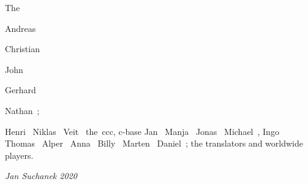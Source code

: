 \smallskip

\noindent The 

\smallskip
Andreas~

Chris\-tian~

John~

Gerhard~

Nathan~;

\medskip
Henri~
Niklas~
Veit~
the~ccc,
{c-base}
Jan~
Manja~
Jonas~
Michael~,
Ingo~
Thomas~
Alper~
Anna~
Billy~
Marten~
Daniel~;
\noindent the translators
and 
worldwide players.

\medskip
\hfill \emph{Jan Suchanek 2020}